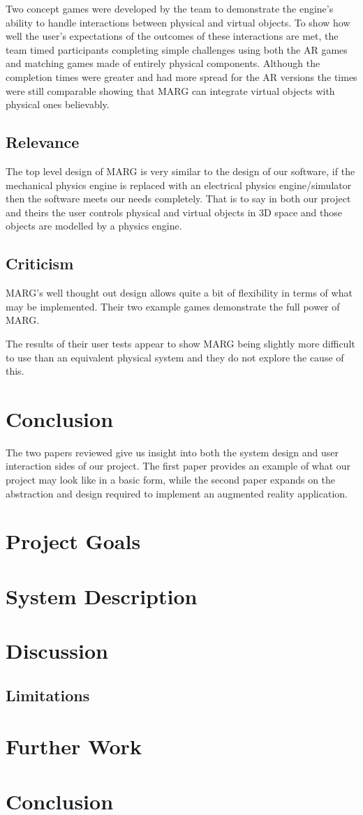 Two concept games were developed by the team to demonstrate the engine's ability to handle interactions between physical and virtual objects. To show how well the user's expectations of the outcomes of these interactions are met, the team timed participants completing simple challenges using both the AR games and matching games made of entirely physical components. Although the completion times were greater and had more spread for the AR versions the times were still comparable
showing that MARG can integrate virtual objects with physical ones believably.

\subsection{Relevance}
The top level design of MARG is very similar to the design of our software, if the mechanical physics engine is replaced with an electrical physics engine/simulator then the software meets our needs completely. That is to say in both our project and theirs the user controls physical and virtual objects in 3D space and those objects are modelled by a physics engine.

\subsection{Criticism}
MARG's well thought out design allows quite a bit of flexibility in terms of what may be implemented. Their two example games demonstrate the full power of MARG.

The results of their user tests appear to show MARG being slightly more difficult to use than an equivalent physical system and they do not explore the cause of this.

\section{Conclusion}
The two papers reviewed give us insight into both the system design and user interaction sides of our project. The first paper provides an example of what our project may look like in a basic form, while the second paper expands on the abstraction and design required to implement an augmented reality application.

\section{Project Goals}

\section{System Description}

\section{Discussion}

\subsection{Limitations}

\section{Further Work}

\section{Conclusion}

